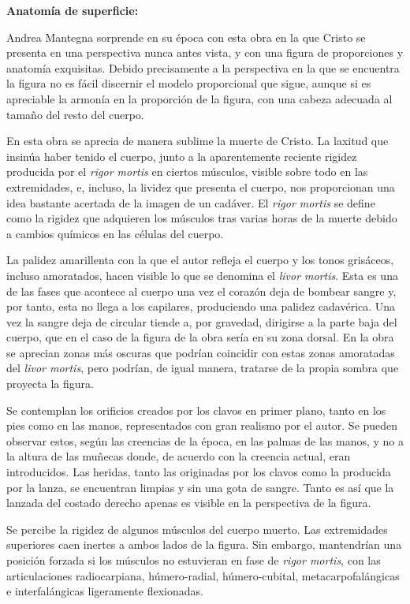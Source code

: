 \vspace{12pt}
\textbf{Anatomía de superficie:}

Andrea Mantegna sorprende en su época con esta obra en la que Cristo se presenta en una perspectiva nunca antes vista, y con una figura de proporciones y anatomía exquisitas. Debido precisamente a la perspectiva en la que se encuentra la figura no es fácil discernir el modelo proporcional que sigue, aunque si es apreciable la armonía en la proporción de la figura, con una cabeza adecuada al tamaño del resto del cuerpo.

En esta obra se aprecia de manera sublime la muerte de Cristo. La laxitud que insinúa haber tenido el cuerpo, junto a la aparentemente reciente rigidez producida por el \textit{rigor mortis} en ciertos músculos, visible sobre todo en las extremidades, e, incluso, la lividez que presenta el cuerpo, nos proporcionan una idea bastante acertada de la imagen de un cadáver. El \textit{rigor mortis} se define como la rigidez que adquieren los músculos tras varias horas de la muerte debido a cambios químicos en las células del cuerpo.

La palidez amarillenta con la que el autor refleja el cuerpo y los tonos grisáceos, incluso amoratados, hacen visible lo que se denomina el \textit{livor mortis}. Esta es una de las fases que acontece al cuerpo una vez el corazón deja de bombear sangre y, por tanto, esta no llega a los capilares, produciendo una palidez cadavérica. Una vez la sangre deja de circular tiende a, por gravedad, dirigirse a la parte baja del cuerpo, que en el caso de la figura de la obra sería en su zona dorsal. En la obra se aprecian zonas más oscuras que podrían coincidir con estas zonas amoratadas del \textit{livor mortis}, pero podrían, de igual manera, tratarse de la propia sombra que proyecta la figura.

Se contemplan los orificios creados por los clavos en primer plano, tanto en los pies como en las manos, representados con gran realismo por el autor. Se pueden observar estos, según las creencias de la época, en las palmas de las manos, y no a la altura de las muñecas donde, de acuerdo con la creencia actual, eran introducidos.
Las heridas, tanto las originadas por los clavos como la producida por la lanza, se encuentran limpias y sin una gota de sangre. Tanto es así que la lanzada del costado derecho apenas es visible en la perspectiva de la figura. 

Se percibe la rigidez de algunos músculos del cuerpo muerto. Las extremidades superiores caen inertes a ambos lados de la figura. Sin embargo, mantendrían una posición forzada si los músculos no estuvieran en fase de \textit{rigor mortis}, con las articulaciones radiocarpiana, húmero-radial, húmero-cubital, metacarpofalángicas e interfalángicas  ligeramente flexionadas.

